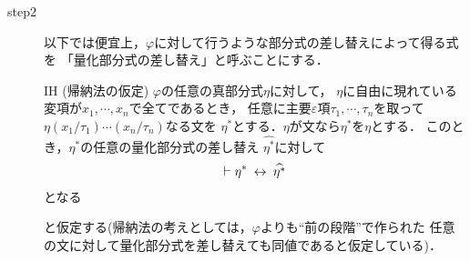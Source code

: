 \begin{sketch}
\begin{description}
				
			\item[step2]
				以下では便宜上，$\varphi$に対して行うような部分式の差し替えによって得る式を
				「量化部分式の差し替え」と呼ぶことにする．
				
				\begin{itembox}[l]{IH (帰納法の仮定)}
					$\varphi$の任意の真部分式$\eta$に対して，
					$\eta$に自由に現れている変項が$x_{1},\cdots,x_{n}$で全てであるとき，
					任意に主要$\varepsilon$項$\tau_{1},\cdots,\tau_{n}$を取って
					$\eta(x_{1}/\tau_{1})\cdots(x_{n}/\tau_{n})$なる文を
					$\eta^{*}$とする．$\eta$が文なら$\eta^{*}$を$\eta$とする．
					このとき，$\eta^{*}$の任意の量化部分式の差し替え
					$\widehat{\eta^{*}}$に対して
					\begin{align}
						\vdash \eta^{*} \hspace{0.25em}\leftrightarrow\hspace{0.25em} \widehat{\eta^{*}}
					\end{align}
					となる
				\end{itembox}
				と仮定する(帰納法の考えとしては，$\varphi$よりも``前の段階''で作られた
				任意の文に対して量化部分式を差し替えても同値であると仮定している)．
				

\end{description}
\end{sketch}

